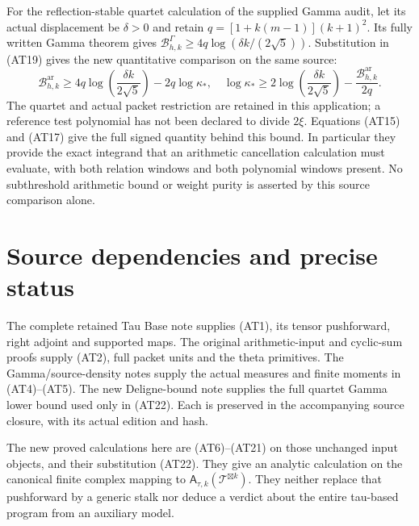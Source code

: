 \documentclass[11pt]{article}
\newcommand{\ar}{\mathrm{ar}}
\newcommand{\Ga}{\Gamma}
\begin{document}
For the reflection-stable quartet calculation of the supplied
Gamma audit, let its actual displacement be $\delta>0$ and
retain $q=[1+k(m-1)](k+1)^2$. Its fully written Gamma theorem
gives $\mathcal B^\Ga_{h,k}\ge
4q\log(\delta k/(2\sqrt5))$. Substitution in (AT19) gives the
new quantitative comparison on the same source:
\[
 \mathcal B^\ar_{h,k}\ge
 4q\log\!\left(\frac{\delta k}{2\sqrt5}\right)-2q\log\kappa_*,
 \quad
 \log\kappa_*\ge
 2\log\!\left(\frac{\delta k}{2\sqrt5}\right)
       -\frac{\mathcal B^\ar_{h,k}}{2q}.                   \tag{AT22}
\]
The quartet and actual packet restriction are retained in this
application; a reference test polynomial has not been declared
to divide $2\xi$. Equations (AT15) and (AT17) give the full
signed quantity behind this bound. In particular they provide
the exact integrand that an arithmetic cancellation calculation
must evaluate, with both relation windows and both polynomial
windows present. No subthreshold arithmetic bound or weight
purity is asserted by this source comparison alone.

\section{Source dependencies and precise status}

The complete retained Tau Base note supplies (AT1), its tensor
pushforward, right adjoint and supported maps. The original
arithmetic-input and cyclic-sum proofs supply (AT2), full packet
units and the theta primitives. The Gamma/source-density notes
supply the actual measures and finite moments in (AT4)--(AT5).
The new Deligne-bound note supplies the full quartet Gamma
lower bound used only in (AT22). Each is preserved in the
accompanying source closure, with its actual edition and hash.

The new proved calculations here are (AT6)--(AT21) on those
unchanged input objects, and their substitution (AT22). They
give an analytic calculation on the canonical finite complex
mapping to $\mathsf A_{\tau,k}(\mathcal T^{\boxtimes k})$.
They neither replace that pushforward by a generic stalk nor
deduce a verdict about the entire tau-based program from an
auxiliary model.
\end{document}
